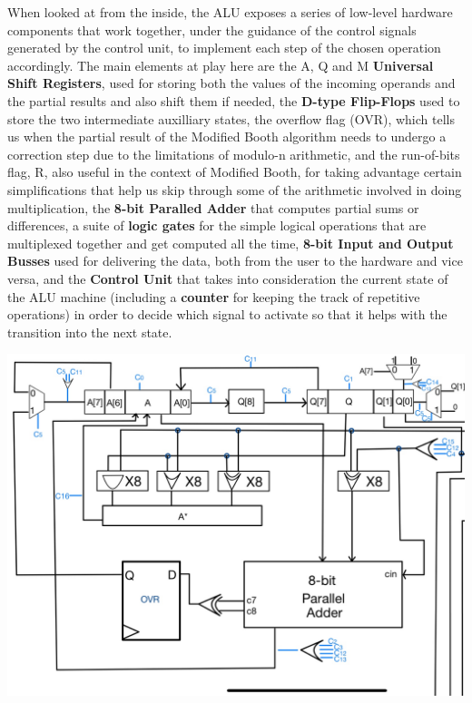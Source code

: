 \documentclass[12pt, letterpaper]{article}
\begin{document}
When looked at from the inside, the ALU exposes a series of low-level hardware components that work together, under the guidance of the control signals
generated by the control unit, to implement each step of the chosen operation accordingly. The main elements at play here are the A, Q and M
\textbf{Universal Shift Registers}, used for storing both the values of the incoming operands and the partial results and also shift them if needed, the
\textbf{D-type Flip-Flops} used to store the two intermediate auxilliary states, the overflow flag (OVR), which tells us when the partial result of the
Modified Booth algorithm needs to undergo a correction step due to the limitations of modulo-n arithmetic, and the run-of-bits flag, R, also useful in
the context of Modified Booth, for taking advantage certain simplifications that help us skip through some of the arithmetic involved in doing multiplication,
the \textbf{8-bit Paralled Adder} that computes partial sums or differences, a suite of \textbf{logic gates} for the simple logical operations that are
multiplexed together and get computed all the time, \textbf{8-bit Input and Output Busses} used for delivering the data, both from the user to the hardware
and vice versa, and the \textbf{Control Unit} that takes into consideration the current state of the ALU machine (including a
\textbf{counter} for keeping the track of repetitive operations) in order to decide which signal to activate so that it helps with the transition into the next state.

\begin{center}
\includegraphics[scale=0.2]{Documentation/ALU1}
\end{center}
\end{document}
